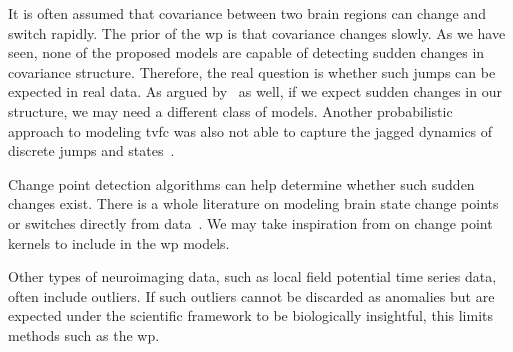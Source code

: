 It is often assumed that covariance between two brain regions can change and switch rapidly.
The prior of the \gls{wp} is that covariance changes slowly.
As we have seen, none of the proposed models are capable of detecting sudden changes in covariance structure.
Therefore, the real question is whether such jumps can be expected in real data.
As argued by~\textcite{Lindquist2014} as well, if we expect sudden changes in our structure, we may need a different class of models.
Another probabilistic approach to modeling \gls{tvfc} was also not able to capture the jagged dynamics of discrete jumps and states~\parencite{Li2019b}.

Change point detection algorithms can help determine whether such sudden changes exist.
There is a whole literature on modeling brain state change points or switches directly from data~\parencite[see e.g.][]{Robinson2010, Cribben2012, Cribben2013, Lindquist2014, Ou2014, Xu2015, Kim2021, Anastasiou2022}.
We may take inspiration from \textcite{Saatci2010, Wilson2013} on change point kernels to include in the \gls{wp} models.

Other types of neuroimaging data, such as local field potential time series data, often include outliers.
If such outliers cannot be discarded as anomalies but are expected under the scientific framework to be biologically insightful, this limits methods such as the \gls{wp}.
